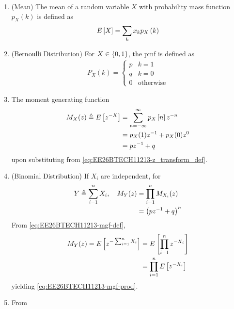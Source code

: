 \begin{enumerate}[label=\thesubsection.\arabic*,ref=\thesubsection.\theenumi]
	\item (Mean)  The mean of a random variable $X$ with probability mass function $p_X(k)$ is defined as
	\begin{align}
		E\left[ X \right] = \sum_{k} x_k p_X\left(k\right) 
		\label{eq:discrete_mean} 
\end{align}
	\item (Bernoulli Distribution)
		For $X \in \left\{0,1\right\}$, the pmf is defined as
        \begin{align}
            P_{X}(k)=
                \begin{cases}
                    p &  k=1 \\
                    q & k=0\\
		    0 & \text{otherwise}
                \end{cases}
        \end{align}
\item The moment generating function 
\begin{align}
\begin{split}
	M_{X}(z)\triangleq E\left[ z^{-X} \right] 
 &=  \sum_{n=-\infty}^{\infty} p_X{}\left[n\right] z^{-n} 
 \\
	&= p_{X}(1)z^{-1} +p_{X}(0)z^{0}\\
    				&=pz^{-1}+q
\end{split}
\label{eq:EE26BTECH11213-mgf-def}
        \end{align}
	upon substituting from \eqref{eq:EE26BTECH11213-z_transform_def}.
\item 
(Binomial Distribution)	If $X_i$ are independent,  for
\begin{align}
\begin{split}
	Y \triangleq \sum_{i=1}^{n}X_i, \quad 
	M_{Y}(z)&=\prod_{i=1}^{n}M_{X_i}(z)        \\
	&=\left(pz^{-1}+q\right)^n
\end{split}
\label{eq:EE26BTECH11213-mgf-prod}
\end{align}
\solution 
From \eqref{eq:EE26BTECH11213-mgf-def},
\begin{align}
	M_{Y}(z)=E\left[ z^{-\sum_{i=1}^{n}X_i} \right]
	&=E\left[ \prod_{i=1}^{n}z^{-X_{i}} \right]
	\\
	&=\prod_{i=1}^{n}E\left[ z^{-X_{i}} \right]
\end{align}
yielding \eqref{eq:EE26BTECH11213-mgf-prod}.
\item From  

\end{enumerate}
